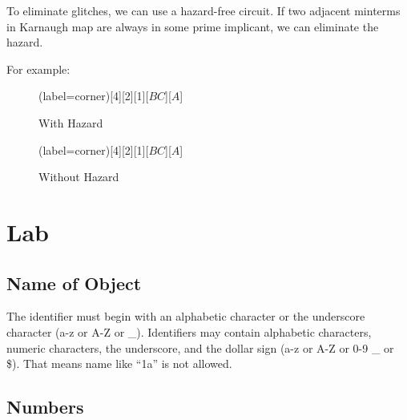 \documentclass[a4paper,12pt]{article}
\begin{document}
\begin{center}
\end{center}

To eliminate glitches, we can use a hazard-free circuit.
If two adjacent minterms in Karnaugh map are always in some prime implicant, we can eliminate the hazard.

For example:
\begin{figure}[H]
	\begin{minipage}{0.5\textwidth}
		\centering
		\begin{karnaugh-map}(label=corner)[4][2][1][$BC$][$A$]
			\autoterms[0]
		\end{karnaugh-map}
		\caption*{With Hazard}
	\end{minipage}
	\begin{minipage}{0.5\textwidth}
		\centering
		\begin{karnaugh-map}(label=corner)[4][2][1][$BC$][$A$]
			\autoterms[0]
		\end{karnaugh-map}
		\caption*{Without Hazard}
	\end{minipage}
\end{figure}

\section{Lab}

\subsection{Name of Object}

The identifier must begin with an alphabetic character or the underscore character (a-z or A-Z or \_).
Identifiers may contain alphabetic characters, numeric characters, the underscore, and the dollar sign (a-z or A-Z or 0-9 \_ or \$).
That means name like ``1a'' is not allowed.

\subsection{Numbers}
\end{document}
